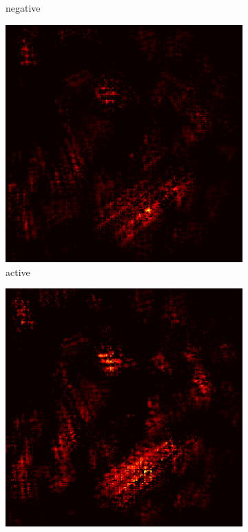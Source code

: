 \documentclass[preprint,12pt]{elsarticle}
\begin{document}
\begin{figure}
\begin{subfigure}{0.14\textwidth}
        \caption{negative}
    \end{subfigure}
    \hfill
    \begin{subfigure}{0.14\textwidth}
        \centering
        \includegraphics[width=\linewidth]{../visualizations/examples/imagenette/cnn/active_saliency_map/2.png}
        \caption{active}
    \end{subfigure}
    \hfill
    \begin{subfigure}{0.14\textwidth}
        \centering
        \includegraphics[width=\linewidth]{../visualizations/examples/imagenette/cnn/inactive_saliency_map/2.png}

\end{subfigure}
\end{figure}
\end{document}
